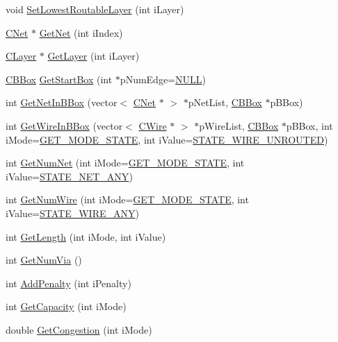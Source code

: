 \begin{DoxyCompactItemize}
\item 
void \mbox{\hyperlink{classCDesign_af7d386170d501eb471b63b2f663690b0}{Set\+Lowest\+Routable\+Layer}} (int i\+Layer)
\item 
\mbox{\hyperlink{classCNet}{C\+Net}} $\ast$ \mbox{\hyperlink{classCDesign_a88d8a50b50adf87e7d53b52757f5a04c}{Get\+Net}} (int i\+Index)
\item 
\mbox{\hyperlink{classCLayer}{C\+Layer}} $\ast$ \mbox{\hyperlink{classCDesign_a33e73f8a75aa2198ff498f7f67633e9a}{Get\+Layer}} (int i\+Layer)
\item 
\mbox{\hyperlink{classCBBox}{C\+B\+Box}} \mbox{\hyperlink{classCDesign_a8890c8bb8e27692b75d0a68eaa28b885}{Get\+Start\+Box}} (int $\ast$p\+Num\+Edge=\mbox{\hyperlink{BoxRouter_8h_a070d2ce7b6bb7e5c05602aa8c308d0c4}{N\+U\+LL}})
\item 
int \mbox{\hyperlink{classCDesign_a5ab5f93449266153a28914c319626289}{Get\+Net\+In\+B\+Box}} (vector$<$ \mbox{\hyperlink{classCNet}{C\+Net}} $\ast$ $>$ $\ast$p\+Net\+List, \mbox{\hyperlink{classCBBox}{C\+B\+Box}} $\ast$p\+B\+Box)
\item 
int \mbox{\hyperlink{classCDesign_a8c52d3fa7d4b688303cc6b1410c6bc2a}{Get\+Wire\+In\+B\+Box}} (vector$<$ \mbox{\hyperlink{classCWire}{C\+Wire}} $\ast$ $>$ $\ast$p\+Wire\+List, \mbox{\hyperlink{classCBBox}{C\+B\+Box}} $\ast$p\+B\+Box, int i\+Mode=\mbox{\hyperlink{BoxRouter_8h_a6f72f2cc9dd31793dd832ccfb2547de4}{G\+E\+T\+\_\+\+M\+O\+D\+E\+\_\+\+S\+T\+A\+TE}}, int i\+Value=\mbox{\hyperlink{BoxRouter_8h_a853da9235ff1dc45acb5ca9556530d21}{S\+T\+A\+T\+E\+\_\+\+W\+I\+R\+E\+\_\+\+U\+N\+R\+O\+U\+T\+ED}})
\item 
int \mbox{\hyperlink{classCDesign_ac4221f754cb8ba12ac6344df3ca31d26}{Get\+Num\+Net}} (int i\+Mode=\mbox{\hyperlink{BoxRouter_8h_a6f72f2cc9dd31793dd832ccfb2547de4}{G\+E\+T\+\_\+\+M\+O\+D\+E\+\_\+\+S\+T\+A\+TE}}, int i\+Value=\mbox{\hyperlink{BoxRouter_8h_a048013954c49608419bca2bcccad5b17}{S\+T\+A\+T\+E\+\_\+\+N\+E\+T\+\_\+\+A\+NY}})
\item 
int \mbox{\hyperlink{classCDesign_a8a75e3e7df767d33c08f31076570ecb8}{Get\+Num\+Wire}} (int i\+Mode=\mbox{\hyperlink{BoxRouter_8h_a6f72f2cc9dd31793dd832ccfb2547de4}{G\+E\+T\+\_\+\+M\+O\+D\+E\+\_\+\+S\+T\+A\+TE}}, int i\+Value=\mbox{\hyperlink{BoxRouter_8h_a1b285251edd87e1423189470586cc719}{S\+T\+A\+T\+E\+\_\+\+W\+I\+R\+E\+\_\+\+A\+NY}})
\item 
int \mbox{\hyperlink{classCDesign_a2ff679a94a04886d69604e7d6820830b}{Get\+Length}} (int i\+Mode, int i\+Value)
\item 
int \mbox{\hyperlink{classCDesign_a28c4e077c911fbe9259d3ade4b91898d}{Get\+Num\+Via}} ()
\item 
int \mbox{\hyperlink{classCDesign_acd0487c3ffd7edf494d4b5d049bd9a3f}{Add\+Penalty}} (int i\+Penalty)
\item 
int \mbox{\hyperlink{classCDesign_a5167e124564fd469dbcfbae344c1f6f9}{Get\+Capacity}} (int i\+Mode)
\item 
double \mbox{\hyperlink{classCDesign_a18f8be6fd29a69a897bc98c5e4b880b6}{Get\+Congestion}} (int i\+Mode)
\end{DoxyCompactItemize}
